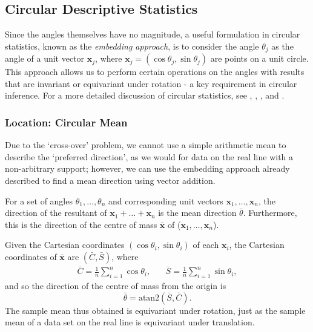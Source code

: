 \documentclass[../../ArchStats.tex]{subfiles}
\begin{document}
\subsection{Circular Descriptive Statistics}
\label{sec:circular-descriptives}

Since the angles themselves have no magnitude, a useful formulation in circular statistics, known as the \textit{embedding approach}, is to consider the angle $\theta_j$ as the angle of a unit vector $\mathbf{x}_j$, where $\mathbf{x}_j = (\cos\theta_j, \sin\theta_j)$ are points on a unit circle. This approach allows us to perform certain operations on the angles with results that are invariant or equivariant under rotation - a key requirement in circular inference. For a more detailed discussion of circular statistics, see \cite{Pewsey2014}, \cite{Fisher1993}, \cite{Mardia1972}, and \cite{Jammalamadaka2001}.



\subsubsection{Location: Circular Mean}
\label{sec:circ-mean}

Due to the `cross-over' problem, we cannot use a simple arithmetic mean to describe the `preferred direction', as we would for data on the real line with a non-arbitrary support; however, we can use the embedding approach already described to find a mean direction using vector addition.

For a set of angles $\theta_1, \dots, \theta_n$ and corresponding unit vectors $\mathbf{x}_1, \dots, \mathbf{x}_n$, the direction of the resultant of $\mathbf{x}_1 + \dots + \mathbf{x}_n$ is the mean direction $\bar{\theta}$. Furthermore, this is the direction of the centre of mass $\mathbf{\bar{x}}$ of ($\mathbf{x}_1, \dots, \mathbf{x}_n$).

Given the Cartesian coordinates $(\cos\theta_i, \sin\theta_i)$ of each $\mathbf{x}_i$, the Cartesian coordinates of $\mathbf{\bar{x}}$ are $(\bar{C}, \bar{S})$, where
	\begin{equation}
	\label{eqn:C-and-S}
	\begin{matrix*}
	\displaystyle{\bar{C} = \frac{1}{n} \sum_{i=1}^{n} \cos \theta_i}, & \, & 
	\displaystyle{\bar{S} = \frac{1}{n} \sum_{i=1}^{n} \sin \theta_i},
	\end{matrix*}
	\end{equation}
and so the direction of the centre of mass from the origin is
	\begin{equation}
	\label{eqn:circ-mean}
	\bar{\theta} = \text{atan2}(\bar{S},\bar{C}).
	\end{equation}
The sample mean thus obtained is equivariant under rotation, just as the sample mean of a data set on the real line is equivariant under translation.
\end{document}

